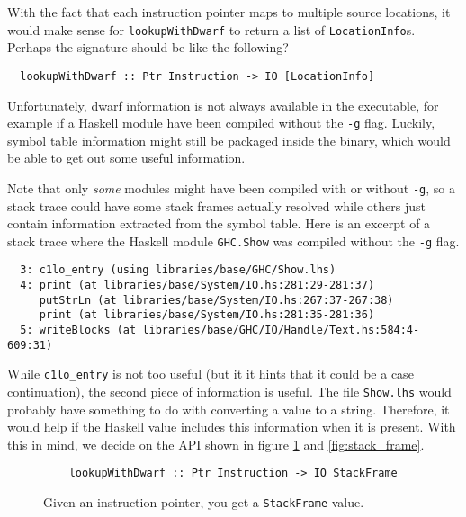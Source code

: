 With the fact that each instruction pointer maps to multiple
source locations, it would make sense for \texttt{lookupWithDwarf} to
return a list of \texttt{LocationInfo}s.
Perhaps the signature should be like the following?

\begin{verbatim}
  lookupWithDwarf :: Ptr Instruction -> IO [LocationInfo]
\end{verbatim}

Unfortunately, dwarf information is not always available in the
executable, for example if a Haskell module have been compiled without
the
\texttt{-g} flag. Luckily, symbol table information might still be
packaged inside the binary, which would be able to get out some useful
information.

Note that only \emph{some} modules might have been compiled
with or without \texttt{-g}, so a stack trace could have some stack frames actually
resolved while others just contain information extracted from the symbol
table. Here is an excerpt of a stack trace where the Haskell module \texttt{GHC.Show}
was compiled without the \texttt{-g} flag.

\begin{verbatim}
  3: c1lo_entry (using libraries/base/GHC/Show.lhs)
  4: print (at libraries/base/System/IO.hs:281:29-281:37)
     putStrLn (at libraries/base/System/IO.hs:267:37-267:38)
     print (at libraries/base/System/IO.hs:281:35-281:36)
  5: writeBlocks (at libraries/base/GHC/IO/Handle/Text.hs:584:4-609:31)
\end{verbatim}

While \texttt{c1lo\_entry} is not too useful (but it it hints that it
could be a case continuation), the second piece of information is
useful. The file \texttt{Show.lhs} would probably have something to do
with converting a value to a string. Therefore, it would help if the
Haskell value includes this information when it is present. With this
in mind, we decide on the API shown in figure \ref{fig:lookup_with_dwarf}
and \ref{fig:stack_frame}.

\begin{figure}
\begin{mdframed}
  \begin{verbatim}
    lookupWithDwarf :: Ptr Instruction -> IO StackFrame
  \end{verbatim}
  \caption{Given an instruction pointer, you get a \texttt{StackFrame} value.}
  \label{fig:lookup_with_dwarf}
\end{mdframed}
\end{figure}

